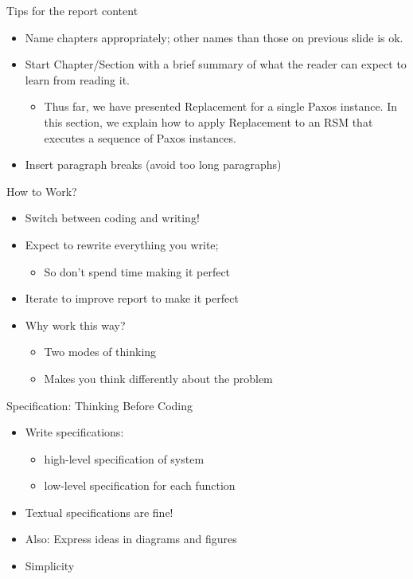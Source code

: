 \documentclass[hyperref={pdfpagelabels=false}, aspectratio=1610]{beamer}
\begin{document}
\begin{frame}
\begin{block}{Tips for the report content}
 \begin{itemize}
  \item Name chapters appropriately; other names than those on previous slide is ok.
  \item Start Chapter/Section with a brief summary of what the reader can expect to learn from reading it.
  \begin{itemize}
   \item Thus far, we have presented Replacement for a single Paxos instance. In this section, we explain how to apply Replacement to an RSM that executes a sequence of Paxos instances.
  \end{itemize}
  \item Insert paragraph breaks (avoid too long paragraphs)
 \end{itemize}
\end{block}
\end{frame}


\begin{frame}
\begin{block}{How to Work?}
 \begin{itemize}
  \item<2-> Switch between coding and writing!
  \item<3-> Expect to rewrite everything you write; 
  \begin{itemize}
  	\item<3-> So don't spend time making it perfect 
  \end{itemize}
  \item<4-> Iterate to improve report to make it perfect
  \item<5-> Why work this way?
  \begin{itemize}
	\item<6-> Two modes of thinking
  	\item<6-> Makes you think differently about the problem 
  \end{itemize}
 \end{itemize}
\end{block}
\end{frame}


\begin{frame}
\begin{block}{Specification: Thinking Before Coding}
 \begin{itemize}
  \item Write specifications:
  \begin{itemize}
  	\item high-level specification of system
	\item low-level specification for each function
  \end{itemize}
  \item Textual specifications are fine!
  \item Also: Express ideas in diagrams and figures
  \item Simplicity
 \end{itemize}
\end{block}
\end{frame}
\end{document}
